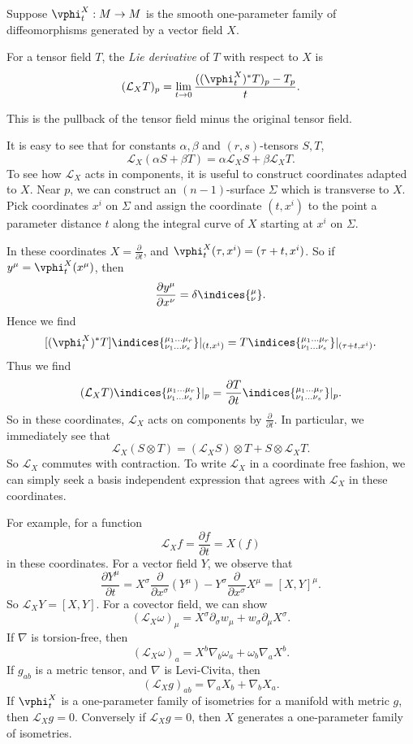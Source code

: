 \documentclass[12pt]{article}
\begin{document}
Suppose $\vphi_t^X : M \to M$ is the smooth one-parameter family of diffeomorphisms generated by a vector field $X$.

\begin{definition}
	For a tensor field $T$, the \emph{Lie derivative} of $T$ with respect to $X$ is
	\[
		(\mathcal{L}_X T)_p = \lim_{t \to 0} \frac{((\vphi_t^X)^{\ast} T)_p - T_p}{t}.
	\]
\end{definition}
This is the pullback of the tensor field minus the original tensor field.

It is easy to see that for constants $\alpha, \beta$ and $(r, s)$-tensors $S, T$,
\[
\mathcal{L}_X(\alpha S + \beta T) = \alpha \mathcal{L}_X S + \beta \mathcal{L}_X T.
\]
To see how $\mathcal{L}_X$ acts in components, it is useful to construct coordinates adapted to $X$. Near $p$, we can construct an $(n-1)$-surface $\Sigma$ which is transverse to $X$. Pick coordinates $x^i$ on $\Sigma$ and assign the coordinate $(t, x^i)$ to the point a parameter distance $t$ along the integral curve of $X$ starting at $x^i$ on $\Sigma$.

In these coordinates $X = \frac{\partial}{\partial t}$, and $\vphi_t^X(\tau, x^i) = (\tau + t, x^i)$. So if $y^{\mu} = \vphi_t^{X}(x^\mu)$, then
\[
\frac{\partial y^\mu}{\partial x^\nu} = \delta\indices{^{\mu}_{\nu}}.
\]
Hence we find
\[
	[(\vphi_t^X)^{\ast} T]\indices{^{\mu_1\ldots \mu_r}_{\nu_1 \ldots \nu_s}} |_{(t, x^i)} = T\indices{^{\mu_1 \ldots \mu_r}_{\nu_1 \ldots \nu_s}}|_{(\tau+ t, x^i)}.
\]
Thus we find
\[
	(\mathcal{L}_X T)\indices{^{\mu_1 \ldots \mu_r}_{\nu_1 \ldots \nu_s}}|_p = \frac{\partial T}{\partial t}\indices{^{\mu_1 \ldots \mu_r}_{\nu_1 \ldots \nu_s}}|_p.
\]
So in these coordinates, $\mathcal{L}_X$ acts on components by $\frac{\partial}{\partial t}$. In particular, we immediately see that
\[
\mathcal{L}_X(S \otimes T) = (\mathcal{L}_X S) \otimes T + S \otimes \mathcal{L}_X T.
\]
So $\mathcal{L}_X$ commutes with contraction. To write $\mathcal{L}_X$ in a coordinate free fashion, we can simply seek a basis independent expression that agrees with $\mathcal{L}_X$ in these coordinates.

For example, for a function
\[
\mathcal{L}_X f = \frac{\partial f}{\partial t} = X(f)
\]
in these coordinates. For a vector field $Y$, we observe that
\[
	\frac{\partial Y^\mu}{\partial t} =  X^\sigma \frac{\partial}{\partial x^\sigma} (Y^\mu) - Y^\sigma \frac{\partial}{\partial x^\sigma} X^\mu = [X, Y]^\mu.
\]
So $\mathcal{L}_X Y = [X, Y]$. For a covector field, we can show
\[
	(\mathcal{L}_X \omega)_\mu = X^\sigma \partial_\sigma w_\mu + w_\sigma \partial_\mu X^\sigma.
\]
If $\nabla$ is torsion-free, then
\[
	(\mathcal{L}_X \omega)_a = X^b \nabla_b \omega_a + \omega_b \nabla_a X^b.
\]
If $g_{ab}$ is a metric tensor, and $\nabla$ is Levi-Civita, then
\[
	(\mathcal{L}_X g)_{ab} = \nabla_a X_b + \nabla_b X_a.
\]
If $\vphi_t^X$ is a one-parameter family of isometries for a manifold with metric $g$, then $\mathcal{L}_X g = 0$. Conversely if $\mathcal{L}_X g = 0$, then $X$ generates a one-parameter family of isometries.
\end{document}
